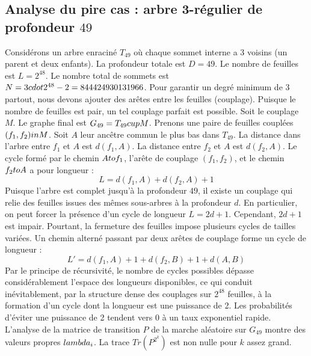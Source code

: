 \documentclass[12pt,a4paper]{article}
\begin{document}
\subsection{Analyse du pire cas : arbre 3-r\'egulier de profondeur $49$}
Consid\'erons un arbre enracin\'e $T_{49}$ o\`u chaque sommet interne a 3 voisins (un parent et deux enfants).
La profondeur totale est $D = 49$.
Le nombre de feuilles est $L = 2^{48}$.
Le nombre total de sommets est $N = 3 \\cdot 2^{48} - 2 = 844424930131966$.
Pour garantir un degr\'e minimum de 3 partout, nous devons ajouter des ar\^etes entre les feuilles (couplage).
Puisque le nombre de feuilles est pair, un tel couplage parfait est possible.
Soit le couplage $M$. Le graphe final est $G_{49} = T_{49} \\cup M$.
Prenons une paire de feuilles coupl\'ees $(f_1, f_2) \\in M$.
Soit $A$ leur anc\^etre commun le plus bas dans $T_{49}$.
La distance dans l'arbre entre $f_1$ et $A$ est $d(f_1, A)$.
La distance entre $f_2$ et $A$ est $d(f_2, A)$.
Le cycle form\'e par le chemin $A \\to f_1$, l'ar\^ete de couplage $(f_1, f_2)$, et le chemin $f_2 \\to A$ a pour longueur :
$$ L = d(f_1, A) + d(f_2, A) + 1 $$
Puisque l'arbre est complet jusqu'\`a la profondeur $49$, il existe un couplage qui relie des feuilles issues des m\^emes sous-arbres \`a la profondeur $d$.
En particulier, on peut forcer la pr\'esence d'un cycle de longueur $L = 2d + 1$. Cependant, $2d+1$ est impair.
Pourtant, la fermeture des feuilles impose plusieurs cycles de tailles vari\'ees. Un chemin altern\'e passant par deux ar\^etes de couplage forme un cycle de longueur :
$$ L' = d(f_1, A) + 1 + d(f_2, B) + 1 + d(A, B) $$
Par le principe de r\'ecursivit\'e, le nombre de cycles possibles d\'epasse consid\'erablement l'espace des longueurs disponibles, ce qui conduit in\'evitablement, par la structure dense des couplages sur $2^{48}$ feuilles, \`a la formation d'un cycle dont la longueur est une puissance de 2. Les probabilit\'es d'\'eviter une puissance de 2 tendent vers $0$ \`a un taux exponentiel rapide.
L'analyse de la matrice de transition $P$ de la marche al\'eatoire sur $G_{49}$ montre des valeurs propres $\\lambda_i$. La trace $Tr(P^{2^k})$ est non nulle pour $k$ assez grand.
\end{document}
